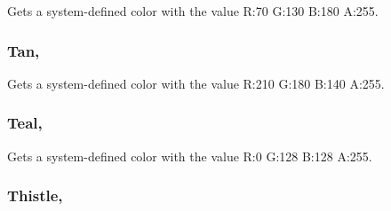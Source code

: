 Gets a system-\/defined color with the value R\+:70 G\+:130 B\+:180 A\+:255.

\hypertarget{structMicrosoft_1_1Xna_1_1Framework_1_1Color_ae2cc25b26cf45fc36820fd18b74b8ecd}{}
\subsubsection[{Tan}]{ Tan\hspace{0.3cm}{\ttfamily [static]}, {\ttfamily [get]}}\label{structMicrosoft_1_1Xna_1_1Framework_1_1Color_ae2cc25b26cf45fc36820fd18b74b8ecd}


Gets a system-\/defined color with the value R\+:210 G\+:180 B\+:140 A\+:255.

\hypertarget{structMicrosoft_1_1Xna_1_1Framework_1_1Color_a9656144912b60001f94a6b7ddfa99b3f}{}
\subsubsection[{Teal}]{ Teal\hspace{0.3cm}{\ttfamily [static]}, {\ttfamily [get]}}\label{structMicrosoft_1_1Xna_1_1Framework_1_1Color_a9656144912b60001f94a6b7ddfa99b3f}


Gets a system-\/defined color with the value R\+:0 G\+:128 B\+:128 A\+:255.

\hypertarget{structMicrosoft_1_1Xna_1_1Framework_1_1Color_afeba7da96a1ce1728a5a82ea2f3048b0}{}
\subsubsection[{Thistle}]{ Thistle\hspace{0.3cm}{\ttfamily [static]}, {\ttfamily [get]}}\label{structMicrosoft_1_1Xna_1_1Framework_1_1Color_afeba7da96a1ce1728a5a82ea2f3048b0}


